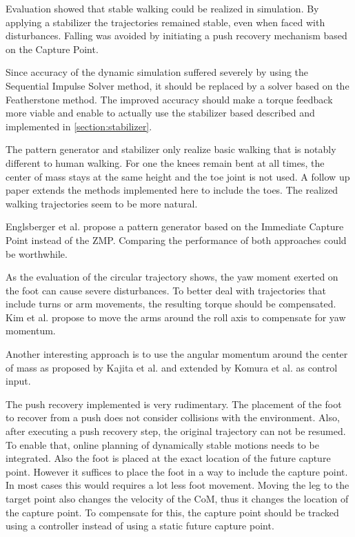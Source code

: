 \documentclass[english,ngerman]{KITreprt}
\begin{document}
Evaluation showed that stable walking could be realized in simulation.
By applying a stabilizer the trajectories remained stable, even when
faced with disturbances. Falling was avoided by initiating a push
recovery mechanism based on the Capture Point.

Since accuracy of the dynamic simulation suffered severely by using the
Sequential Impulse Solver method, it should be replaced by a solver
based on the Featherstone method. The improved accuracy should make a
torque feedback more viable and enable to actually use the stabilizer
based described and implemented in \ref{section:stabilizer}.

The pattern generator and stabilizer only realize basic walking that is
notably different to human walking. For one the knees remain bent at all
times, the center of mass stays at the same height and the toe joint is
not used. A follow up paper \cite{kajita2012evaluation} extends the
methods implemented here to include the toes. The realized walking
trajectories seem to be more natural.

Englsberger et al. \cite{englsberger2011bipedal} propose a pattern
generator based on the Immediate Capture Point instead of the ZMP.
Comparing the performance of both approaches could be worthwhile.

As the evaluation of the circular trajectory shows, the yaw moment
exerted on the foot can cause severe disturbances. To better deal with
trajectories that include turns or arm movements, the resulting torque
should be compensated. Kim et al.\cite{kim2005humanoid} propose to move
the arms around the roll axis to compensate for yaw momentum.

Another interesting approach is to use the angular momentum around the
center of mass as proposed by Kajita et al. \cite{kajita2001balancing}
and extended by Komura et al. \cite{komura2005feedback} as control
input.

The push recovery implemented is very rudimentary. The placement of the
foot to recover from a push does not consider collisions with the
environment. Also, after executing a push recovery step, the original
trajectory can not be resumed. To enable that, online planning of
dynamically stable motions needs to be integrated. Also the foot is
placed at the exact location of the future capture point. However it
suffices to place the foot in a way to include the capture point. In
most cases this would requires a lot less foot movement. Moving the leg
to the target point also changes the velocity of the CoM, thus it
changes the location of the capture point. To compensate for this, the
capture point should be tracked using a controller instead of using a
static future capture point.




\end{document}
